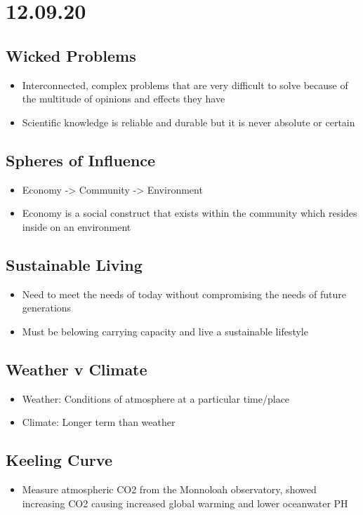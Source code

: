 \documentclass[11pt]{article}
\author{Sudhan Chitgopkar}
\date{\today}
\title{}
\begin{document}
\tableofcontents

\section{12.09.20}
\label{sec:orgc61bf32}
\subsection{Wicked Problems}
\label{sec:orgb8cf567}
\begin{itemize}
\item Interconnected, complex problems that are very difficult to solve because of the multitude of opinions and effects they have
\item Scientific knowledge is reliable and durable but it is never absolute or certain
\end{itemize}
\subsection{Spheres of Influence}
\label{sec:org44e9b24}
\begin{itemize}
\item Economy -> Community -> Environment
\item Economy is a social construct that exists within the community which resides inside on an environment
\end{itemize}
\subsection{Sustainable Living}
\label{sec:org62e89da}
\begin{itemize}
\item Need to meet the needs of today without compromising the needs of future generations
\item Must be belowing carrying capacity and live a sustainable lifestyle
\end{itemize}
\subsection{Weather v Climate}
\label{sec:org03b8eae}
\begin{itemize}
\item Weather: Conditions of atmosphere at a particular time/place
\item Climate: Longer term than weather
\end{itemize}
\subsection{Keeling Curve}
\label{sec:org1a794af}
\begin{itemize}
\item Measure atmospheric CO2 from the Monnoloah observatory, showed increasing CO2 causing increased global warming and lower oceanwater PH
\end{itemize}
\end{document}
